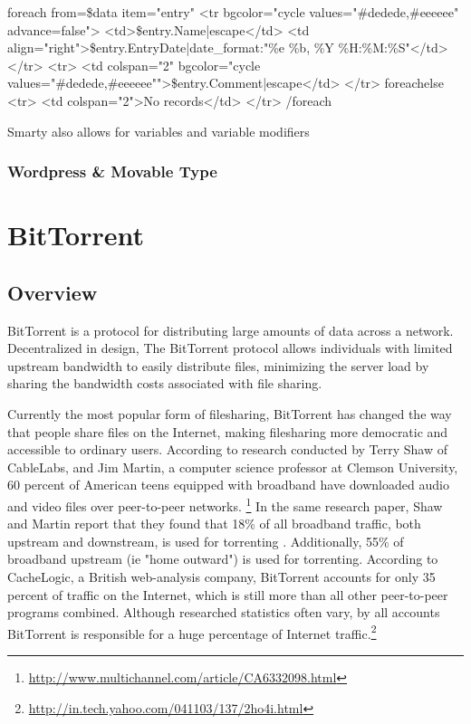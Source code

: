 \documentclass[a4paper,12pt]{report}
\begin{document}
    {foreach from=\$data item="entry"}
        <tr bgcolor="{cycle values="#dedede,#eeeeee" advance=false}">
            <td>{\$entry.Name|escape}</td>        
            <td align="right">{\$entry.EntryDate|date_format:"\%e \%b, \%Y \%H:\%M:\%S"}</td>        
        </tr>
        <tr>
            <td colspan="2" bgcolor="{cycle values="#dedede,#eeeeee"}">{\$entry.Comment|escape}</td>
        </tr>
    {foreachelse}
        <tr>
            <td colspan="2">No records</td>
        </tr>
    {/foreach}

Smarty also allows for variables and variable modifiers  

\subsection {Wordpress & Movable Type}


\chapter{BitTorrent}
\section{Overview}
BitTorrent is a protocol for distributing large amounts of data across a network.
Decentralized in design, The BitTorrent protocol allows individuals with limited upstream bandwidth to easily distribute files, minimizing the server load by sharing the bandwidth costs associated with file sharing.

Currently the most popular form of filesharing, BitTorrent has changed the way that people share files on the Internet, making filesharing more democratic and accessible to ordinary users.
According to research conducted by Terry Shaw of CableLabs, and Jim Martin, a computer science professor at Clemson University, 60 percent of American teens equipped with broadband have downloaded audio and video files over peer-to-peer networks. \footnote { \url{http://www.multichannel.com/article/CA6332098.html}}
In the same research paper, Shaw and Martin report that they found that 18\% of all broadband traffic, both upstream and downstream, is used for torrenting .
Additionally, 55\% of broadband upstream (ie "home outward") is used for torrenting.
According to CacheLogic, a British web-analysis company, BitTorrent accounts for only 35 percent of traffic on the Internet, which is still more than all other peer-to-peer programs combined.  
Although researched statistics often vary, by all accounts BitTorrent is responsible for a huge percentage of Internet traffic.\footnote {\url{http://in.tech.yahoo.com/041103/137/2ho4i.html}}
\end{document}
